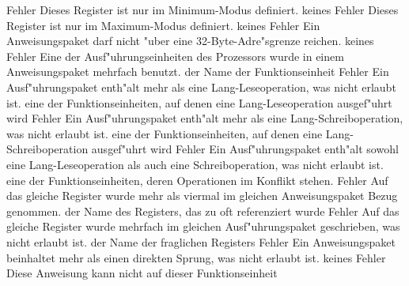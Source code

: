 \documentclass[12pt,a4paper,twoside]{report}
\begin{document}
\begin{description}
               {Fehler}
               {Dieses Register ist nur im Minimum-Modus
                definiert.}
               {keines}
               {Fehler}
               {Dieses Register ist nur im Maximum-Modus
                definiert.}
               {keines}
               {Fehler}
               {Ein Anweisungspaket darf nicht "uber eine
                32-Byte-Adre"sgrenze reichen.}
               {keines}
               {Fehler}
               {Eine der Ausf"uhrungseinheiten des Prozessors wurde in
                einem Anweisungspaket mehrfach benutzt.}
               {der Name der Funktionseinheit}
               {Fehler}
               {Ein Ausf"uhrungspaket enth"alt mehr als eine
                Lang-Leseoperation, was nicht erlaubt ist.}
               {eine der Funktionseinheiten, auf denen eine
                Lang-Leseoperation ausgef"uhrt wird}
               {Fehler}
               {Ein Ausf"uhrungspaket enth"alt mehr als eine
                Lang-Schreiboperation, was nicht erlaubt ist.}
               {eine der Funktionseinheiten, auf denen eine
                Lang-Schreiboperation ausgef"uhrt wird}
               {Fehler}
               {Ein Ausf"uhrungspaket enth"alt sowohl eine
                Lang-Leseoperation als auch eine Schreiboperation,
                was nicht erlaubt ist.}
               {eine der Funktionseinheiten, deren Operationen im
                Konflikt stehen.}
               {Fehler}
               {Auf das gleiche Register wurde mehr als viermal im
                gleichen Anweisungspaket Bezug genommen.}
               {der Name des Registers, das zu oft referenziert wurde}
               {Fehler}
               {Auf das gleiche Register wurde mehrfach im gleichen
                Ausf"uhrungspaket geschrieben, was nicht erlaubt ist.}
               {der Name der fraglichen Registers}
               {Fehler}
               {Ein Anweisungspaket beinhaltet mehr als einen direkten
                Sprung, was nicht erlaubt ist.}
               {keines}
               {Fehler}
               {Diese Anweisung kann nicht auf dieser Funktionseinheit
}
\end{description}
\end{document}
